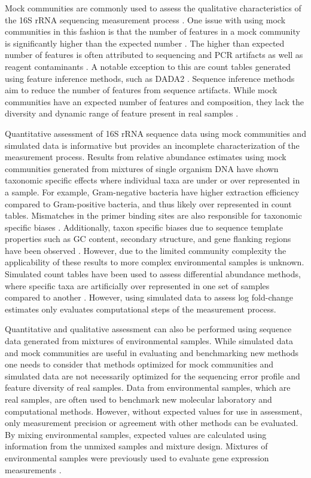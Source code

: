 \documentclass[linenumbers]{bmcart}
\begin{document}
Mock communities are commonly used to assess the qualitative
characteristics of the 16S rRNA sequencing measurement process
\cite{bokulich2016mockrobiota}. One issue with using mock communities
in this fashion is that the number of features in a mock
community is significantly higher than the expected number
\cite{Kopylova2014}. The higher than expected number of features is
often attributed to sequencing and PCR artifacts as well as reagent
contaminants \cite{brooks2015truth, Huse2010}. A notable exception to
this are count tables generated using feature inference methods, 
such as DADA2 \cite{callahan2016dada2}. Sequence
inference methods aim to reduce the number of features from sequence artifacts.
While mock communities have an expected number of features and
composition, they lack the diversity and dynamic range of feature
present in real samples \cite{bokulich2016mockrobiota}.

Quantitative assessment of 16S rRNA sequence data using mock communities and
simulated data is informative but provides an
incomplete characterization of the measurement process.
Results from relative abundance estimates using mock communities generated from
mixtures of single organism DNA have shown taxonomic specific effects
where individual taxa are under or over represented in a sample. For
example, Gram-negative bacteria have higher extraction efficiency
compared to Gram-positive bacteria, and thus likely over represented 
in count tables\cite{Costea2017, Olson2012}.
Mismatches in the primer binding sites are also responsible for
taxonomic specific biases
\cite{brooks2015truth, klindworth2012evaluation, Gohl2016}.
Additionally, taxon specific biases due to sequence template properties
such as GC content, secondary structure, and gene flanking regions have
been observed \cite{Pinto2012, Hansen1998, Gohl2016}.
However, due to the limited community complexity the applicability of
these results to more complex environmental samples is unknown. Simulated count
tables have been used to assess differential abundance methods, where specific taxa are
artificially over represented in one set of samples compared to another
\cite{McMurdie2014}. However, using simulated data to assess log fold-change
estimates only evaluates computational steps of the measurement process.

Quantitative and qualitative assessment can also be performed using
sequence data generated from mixtures of environmental samples. While
simulated data and mock communities are useful in evaluating and
benchmarking new methods one needs to consider that methods optimized
for mock communities and simulated data are not necessarily optimized
for the sequencing error profile and feature diversity of real samples.
Data from environmental samples, which are real samples, are often used
to benchmark new molecular laboratory and computational methods.
However, without expected values for use in assessment, only measurement
precision or agreement with other methods can be evaluated. By mixing
environmental samples, expected values are calculated using information
from the unmixed samples and mixture design. Mixtures of environmental
samples were previously used to evaluate gene expression measurements
\cite{parsons2015using, pine2011adaptable, thompson2005use}.
\end{document}
